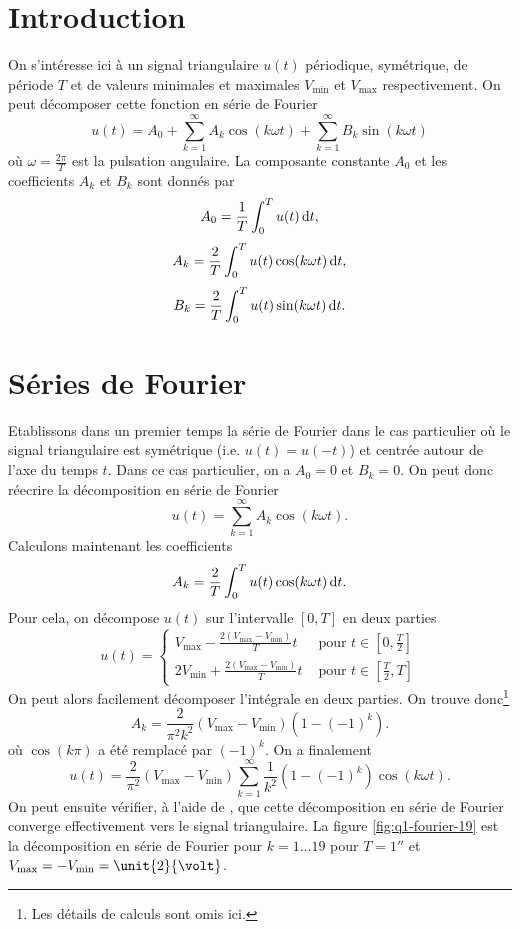 

\section{Introduction}
On s'intéresse ici à un signal triangulaire $u(t)$
périodique, symétrique, de période $T$ et de valeurs 
minimales et maximales $V_{\text{min}}$ et $V_{\text{max}}$
respectivement. On peut décomposer cette fonction
en série de Fourier
\begin{equation}
	u(t) = A_0 + \sum_{k=1}^{\infty} A_k\cos(k\omega t)
	+ \sum_{k=1}^{\infty} B_k\sin(k\omega t)
	\label{eq:fourier-real}
\end{equation}
où $\omega = \frac{2\pi}{T}$ est la pulsation angulaire.
La composante constante $A_0$ et les coefficients $A_k$
et $B_k$ sont donnés par 
\begin{equation} 
	A_0 = \frac{1}{T} \int_0^T u(t)\operatorname{d}\! t,
	\label{eq:fourier-constant}
\end{equation}
\begin{equation}
	A_k = \frac{2}{T} \int_0^T u(t)\cos(k\omega t)\operatorname{d}\! t,
	\label{eq:fourier-coef-cos}
\end{equation}
\begin{equation}
	B_k = \frac{2}{T} \int_0^T u(t)\sin(k\omega t)\operatorname{d}\! t.
	\label{eq:fourier-coef-sin}
\end{equation}

\section{Séries de Fourier}
Etablissons dans un premier temps la série de Fourier
dans le cas particulier où le signal triangulaire
est symétrique (i.e. $u(t) = u(-t)$) et centrée autour
de l'axe du temps $t$. Dans ce cas particulier, on a $A_0 = 0$
et $B_k = 0$. On peut donc réecrire la décomposition
en série de Fourier 
\[ u(t) = \sum_{k=1}^{\infty} A_k\cos(k\omega t).\]
Calculons maintenant les coefficients
\[ A_k = \frac{2}{T} \int_0^T u(t)\cos(k\omega t)\operatorname{d}\! t.\]
Pour cela, on décompose $u(t)$ sur l'intervalle $[0,T]$
en deux parties
\[ u(t) =
	\left\{
		\begin{array}{rl}
			V_{\text{max}} - \frac{2(V_{\text{max}}-V_{\text{min}})}{T}t 	
			&\text{ pour } t \in [0,\frac{T}{2}]  \\
			2V_{\text{min}} + \frac{2(V_{\text{max}}-V_{\text{min}})}{T}t 
			&\text{ pour }t \in [\frac{T}{2},T] 
		\end{array}
	\right.
\]
On peut alors facilement décomposer l'intégrale en deux
parties. On trouve donc\footnote{Les détails
de calculs sont omis ici.}
\[ A_k = \frac{2}{\pi^2k^2}(V_{\text{max}}-V_{\text{min}})
(1 - (-1)^k).\]
où $\cos(k\pi)$ a été remplacé par $(-1)^k$.
On a finalement
\[ u(t) = \frac{2}{\pi^2}(V_{\text{max}}-V_{\text{min}})
\sum_{k=1}^{\infty} \frac{1}{k^2}(1 - (-1)^k)\cos(k\omega t).\]
On peut ensuite vérifier, à l'aide de \matlab,
que cette décomposition en série de Fourier
converge effectivement vers le signal triangulaire.
La figure \ref{fig:q1-fourier-19} est la décomposition
en série de Fourier pour $k = 1\dots19$ pour 
$T = \unit{1}{\second}$ et $V_{\text{max}} = 
-V_{\text{min}} = \unit{2}{\volt}$.

